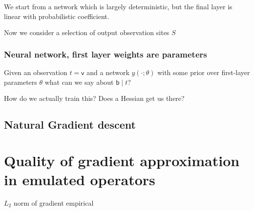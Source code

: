 \documentclass{article}
\newcommand\numberthis{\addtocounter{equation}{1}\tag{\theequation}}
\newcommand{\vv}[1]{\boldsymbol{#1}}
\newcommand{\mm}[1]{\mathrm{#1}}
\newcommand{\rv}[1]{\mathsf{#1}}
\newcommand{\vrv}[1]{\vv{\rv{#1}}}
\newcommand{\dist}[1]{\mathcal{#1}}
\newcommand{\set}[1]{#1}
\newcommand{\op}[1]{\mathscr{#1}}
\newcommand{\gvn}{\mid}
\newcommand{\latwt}{\vrv{w}}
\begin{document}
We start from a network which is largely deterministic, but the final layer is linear with probabilistic coefficient.

Now we consider a selection of output observation sites \(\set{S}\)


\subsubsection{Neural network, first layer weights are parameters}
Given an observation \(t=\vrv{v}\) and a network \(y(\cdot;\theta)\) with some prior over first-layer parameters \(\theta\) what can we say about \(\rv{b}\gvn t\)?

How do we actually train this?
Does a Hessian get us there?

\subsection{Natural Gradient descent}




\section{Quality of gradient approximation in emulated operators}

\(L_2\) norm of gradient empirical
\end{document}
